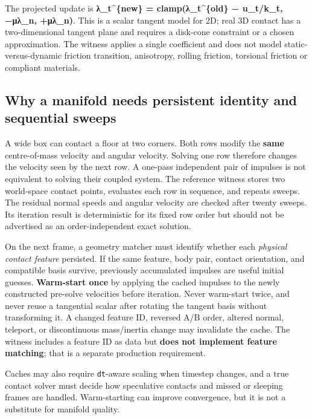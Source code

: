 The projected update is \textbf{λ\_t\^{}\{new\} = clamp(λ\_t\^{}\{old\} − u\_t/k\_t, −μλ\_n, +μλ\_n)}. This is a scalar tangent model for 2D; real 3D contact has a two-dimensional tangent plane and requires a disk-cone constraint or a chosen approximation. The witness applies a single coefficient and does not model static-versus-dynamic friction transition, anisotropy, rolling friction, torsional friction or compliant materials.

\subsection{Why a manifold needs persistent identity and sequential sweeps}\label{appendix-c9d92e145503-why-a-manifold-needs-persistent-identity-and-sequential-sweeps}

A wide box can contact a floor at two corners. Both rows modify the \textbf{same} centre-of-mass velocity and angular velocity. Solving one row therefore changes the velocity seen by the next row. A one-pass independent pair of impulses is not equivalent to solving their coupled system. The reference witness stores two world-space contact points, evaluates each row in sequence, and repeats sweeps. The residual normal speeds and angular velocity are checked after twenty sweeps. Its iteration result is deterministic for its fixed row order but should not be advertised as an order-independent exact solution.

On the next frame, a geometry matcher must identify whether each \emph{physical contact feature} persisted. If the same feature, body pair, contact orientation, and compatible basis survive, previously accumulated impulses are useful initial guesses. \textbf{Warm-start once} by applying the cached impulses to the newly constructed pre-solve velocities before iteration. Never warm-start twice, and never reuse a tangential scalar after rotating the tangent basis without transforming it. A changed feature ID, reversed A/B order, altered normal, teleport, or discontinuous mass/inertia change may invalidate the cache. The witness includes a feature ID as data but \textbf{does not implement feature matching}; that is a separate production requirement.

Caches may also require \texttt{dt}-aware scaling when timestep changes, and a true contact solver must decide how speculative contacts and missed or sleeping frames are handled. Warm-starting can improve convergence, but it is not a substitute for manifold quality.

